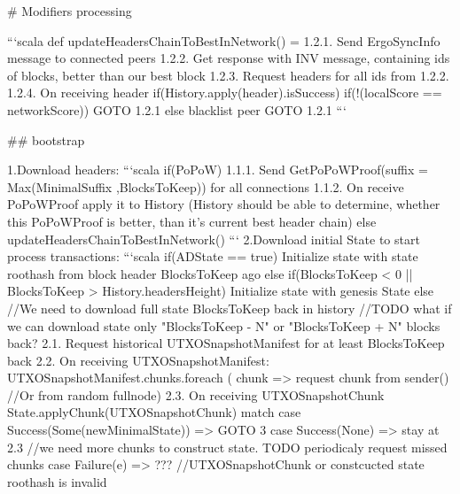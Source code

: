 \documentclass[]{report}   %
\begin{document}
# Modifiers processing

```scala
def updateHeadersChainToBestInNetwork() = {
  1.2.1. Send ErgoSyncInfo message to connected peers
  1.2.2. Get response with INV message, containing ids of blocks, better than our best block
  1.2.3. Request headers for all ids from 1.2.2.
  1.2.4. On receiving header
   if(History.apply(header).isSuccess) {
      if(!(localScore == networkScore)) GOTO 1.2.1
   } else {
      blacklist peer
      GOTO 1.2.1
   }
}
```

## bootstrap

1.Download headers:
```scala
if(PoPoW) {
  1.1.1. Send GetPoPoWProof(suffix = Max(MinimalSuffix ,BlocksToKeep)) for all connections
  1.1.2. On receive PoPoWProof apply it to History (History should be able to determine, whether this PoPoWProof is better, than it's current best header chain)
} else {
  updateHeadersChainToBestInNetwork()
}
```
2.Download initial State to start process transactions:
```scala
if(ADState == true) {
  Initialize state with state roothash from block header BlocksToKeep ago
} else if(BlocksToKeep < 0 || BlocksToKeep > History.headersHeight) {
  Initialize state with genesis State
} else {
  //We need to download full state BlocksToKeep back in history
  //TODO what if we can download state only "BlocksToKeep - N" or "BlocksToKeep + N" blocks back?
  2.1. Request historical UTXOSnapshotManifest for at least BlocksToKeep back
  2.2. On receiving UTXOSnapshotManifest: 
    UTXOSnapshotManifest.chunks.foreach ( chunk => request chunk from sender() //Or from random fullnode)
  2.3. On receiving UTXOSnapshotChunk
  State.applyChunk(UTXOSnapshotChunk) match {
     case Success(Some(newMinimalState)) => GOTO 3
     case Success(None) => stay at 2.3 //we need more chunks to construct state. TODO periodicaly request missed chunks
     case Failure(e) => ??? //UTXOSnapshotChunk or constcucted state roothash is invalid  
  }
}
\end{document}
